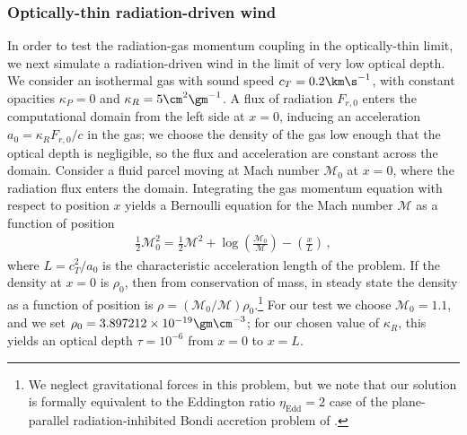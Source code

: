 \documentclass[fleqn,usenatbib]{mnras}
\begin{document}
\subsubsection{Optically-thin radiation-driven wind}
In order to test the radiation-gas momentum coupling in the optically-thin limit, we next simulate a radiation-driven wind in the limit of very low optical depth. We consider an isothermal gas with sound speed $c_T = 0.2 \km \s^{-1}$, with constant opacities $\kappa_P = 0$ and $\kappa_R = 5 \cm^2 \gm^{-1}$. A flux of radiation $F_{r,0}$ enters the computational domain from the left side at $x=0$, inducing an acceleration $a_0 = \kappa_R F_{r,0}/c$ in the gas; we choose the density of the gas low enough that the optical depth is negligible, so the flux and acceleration are constant across the domain. Consider a fluid parcel moving at Mach number $\mathcal{M}_0$ at $x = 0$, where the radiation flux enters the domain. Integrating the gas momentum equation with respect to position $x$ yields a Bernoulli equation for the Mach number $\mathcal{M}$ as a function of position
\begin{align}
\frac{1}{2} \mathcal{M}_0^2 = \frac{1}{2} \mathcal{M}^2 + \log \left({\frac{\mathcal{M}_0}{\mathcal{M}}}\right) - \left( \frac{x}{L} \right) \, ,
\label{eq:wind}
\end{align}
where $L = c_T^2/a_0$ is the characteristic acceleration length of the problem. If the density at $x = 0$ is $\rho_0$, then from conservation of mass, in steady state the density as a function of position is $\rho = (\mathcal{M}_0/\mathcal{M}) \rho_0$.\footnote{We neglect gravitational forces in this problem, but we note that our solution is formally equivalent to the Eddington ratio $\eta_{\text{Edd}} = 2$ case of the plane-parallel radiation-inhibited Bondi accretion problem of \cite{Skinner_2013}.} For our test we choose $\mathcal{M}_0 = 1.1$, and we set $\rho_0 = 3.897212 \times 10^{-19} \gm \cm^{-3}$; for our chosen value of $\kappa_R$, this yields an optical depth $\tau = 10^{-6}$ from $x=0$ to $x=L$.
\end{document}
